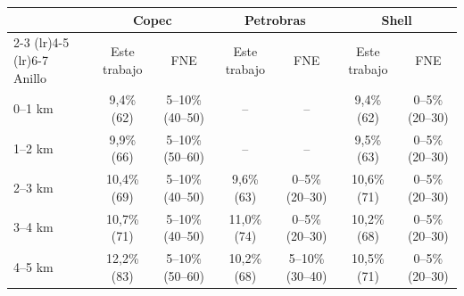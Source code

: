 \begin{tabular}{lcccccc}
\toprule
 & \multicolumn{2}{c}{Copec} & \multicolumn{2}{c}{Petrobras} & \multicolumn{2}{c}{Shell} \\
\cmidrule(lr){2-3} \cmidrule(lr){4-5} \cmidrule(lr){6-7}
Anillo & Este trabajo & FNE & Este trabajo & FNE & Este trabajo & FNE \\
\midrule
0--1 km & 9{,}4\% (62) & 5--10\% (40--50) & -- & -- & 9{,}4\% (62) & 0--5\% (20--30) \\
1--2 km & 9{,}9\% (66) & 5--10\% (50--60) & -- & -- & 9{,}5\% (63) & 0--5\% (20--30) \\
2--3 km & 10{,}4\% (69) & 5--10\% (40--50) & 9{,}6\% (63) & 0--5\% (20--30) & 10{,}6\% (71) & 0--5\% (20--30) \\
3--4 km & 10{,}7\% (71) & 5--10\% (40--50) & 11{,}0\% (74) & 0--5\% (20--30) & 10{,}2\% (68) & 0--5\% (20--30) \\
4--5 km & 12{,}2\% (83) & 5--10\% (50--60) & 10{,}2\% (68) & 5--10\% (30--40) & 10{,}5\% (71) & 0--5\% (20--30) \\
\bottomrule
\end{tabular}

